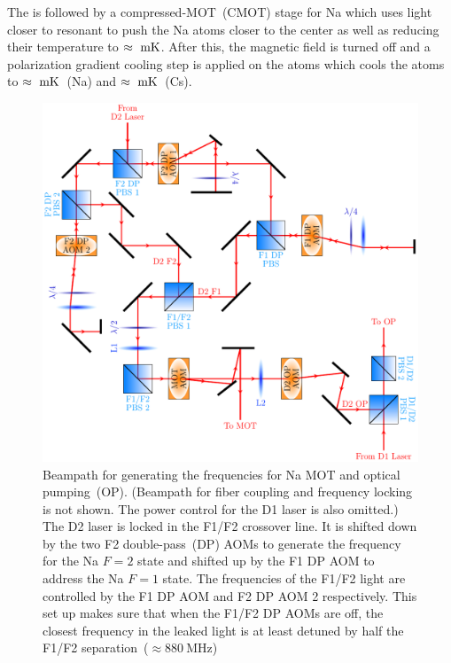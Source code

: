 
The is followed by a compressed-MOT~(CMOT) stage for Na
which uses light closer to resonant to push the Na atoms closer to the center
as well as reducing their temperature to $\approx\todo{number}~\mathrm{mK}$.
After this, the magnetic field is turned off and
a polarization gradient cooling step is applied on the atoms
which cools the atoms to $\approx\todo{number}~\mathrm{mK}$~(Na)
and $\approx\todo{number}~\mathrm{mK}$~(Cs).

\begin{figure}
  \centering
  \includegraphics[width=\textwidth]{figures/loading_na_res_beampath.pdf}
  \caption[Beampath for Na D1 and D2 light.]{
    Beampath for generating the frequencies for Na MOT and optical pumping~(OP).
    (Beampath for fiber coupling and frequency locking is not shown.
    The power control for the D1 laser is also omitted.)
    The D2 laser is locked in the F1/F2 crossover line.
    It is shifted down by the two F2 double-pass~(DP) AOMs to generate the frequency
    for the Na $F=2$ state and shifted up by the F1 DP AOM to address the Na $F=1$ state.
    The frequencies of the F1/F2 light are controlled by the F1 DP AOM
    and F2 DP AOM 2 respectively.
    This set up makes sure that when the F1/F2 DP AOMs are off,
    the closest frequency in the leaked light is at least detuned
    by half the F1/F2 separation~($\approx880~\mathrm{MHz}$)~\cite{steck_sodium_2019}
}
\end{figure}
